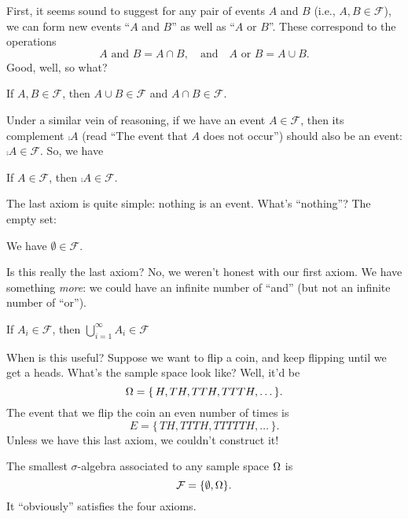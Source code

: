 First, it seems sound to suggest for any pair of events $A$ and $B$
(i.e., $A,B\in\mathcal{F}$), we
can form new events ``$A$ and $B$'' as well as ``$A$ or $B$''. These
correspond to the operations
\begin{equation*}
\mbox{$A$ and $B$}=A\cap B,\quad\mbox{and}\quad
\mbox{$A$ or $B$}=A\cup B.
\end{equation*}
Good, well, so what?

\begin{axiom} 
If $A,B\in\mathcal{F}$, then $A\cup B\in\mathcal{F}$ and $A\cap
B\in\mathcal{F}$. 
\end{axiom}

Under a similar vein of reasoning, if we have an event
$A\in\mathcal{F}$, then its complement $\comp{A}$ (read ``The event that
$A$ does not occur'') should also be an event:
$\comp{A}\in\mathcal{F}$. So, we have
\begin{axiom}
If $A\in\mathcal{F}$, then $\comp{A}\in\mathcal{F}$.
\end{axiom}

The last axiom is quite simple: nothing is an event. What's ``nothing''?
The empty set:
\begin{axiom}
We have $\emptyset\in\mathcal{F}$.
\end{axiom}
Is this really the last axiom? No, we weren't honest with our first
axiom. We have something \emph{more}: we could have an infinite number
of ``and'' (but not an infinite number of ``or'').
\begin{axiom}
If $A_{i}\in\mathcal{F}$, then $\displaystyle\bigcup_{i=1}^{\infty}A_{i}\in\mathcal{F}$
\end{axiom}
When is this useful? Suppose we want to flip a coin, and keep flipping
until we get a heads. What's the sample space look like? Well, it'd be
\begin{equation}
\Omega=\{\, H,TH, TTH, TTTH, \dots\,\}.
\end{equation}
The event that we flip the coin an even number of times is
\begin{equation}
E = \{\, TH, TTTH, TTTTTH, \dots\,\}.
\end{equation}
Unless we have this last axiom, we couldn't construct it!

 The smallest $\sigma$-algebra associated to any sample space
$\Omega$ is 
\begin{equation}
\mathcal{F}=\{\emptyset,\Omega\}.
\end{equation}
It ``obviously'' satisfies the four axioms.

